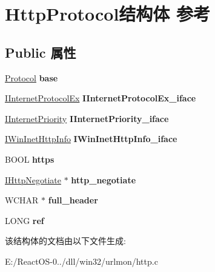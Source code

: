 \hypertarget{struct_http_protocol}{}\section{Http\+Protocol结构体 参考}
\label{struct_http_protocol}
\subsection*{Public 属性}
\begin{DoxyCompactItemize}
\item 
\mbox{\label{struct_http_protocol_a151cc2099e674107fa709330ba58706e}} 
\hyperlink{struct_protocol}{Protocol} {\bfseries base}
\item 
\mbox{\label{struct_http_protocol_a860d3064a3459a85f30484db3414093b}} 
\hyperlink{interface_i_internet_protocol_ex}{I\+Internet\+Protocol\+Ex} {\bfseries I\+Internet\+Protocol\+Ex\+\_\+iface}
\item 
\mbox{\label{struct_http_protocol_abe532b241a04ae9ff005e2d43a61b737}} 
\hyperlink{interface_i_internet_priority}{I\+Internet\+Priority} {\bfseries I\+Internet\+Priority\+\_\+iface}
\item 
\mbox{\label{struct_http_protocol_a8bc6209647dd18b9ab90d6782fad1ef6}} 
\hyperlink{interface_i_win_inet_http_info}{I\+Win\+Inet\+Http\+Info} {\bfseries I\+Win\+Inet\+Http\+Info\+\_\+iface}
\item 
\mbox{\label{struct_http_protocol_a8d9721ac149323721011f81b6c01925f}} 
B\+O\+OL {\bfseries https}
\item 
\mbox{\label{struct_http_protocol_a3ea845429bd8e60c7f5843ba45e1460c}} 
\hyperlink{interface_i_http_negotiate}{I\+Http\+Negotiate} $\ast$ {\bfseries http\+\_\+negotiate}
\item 
\mbox{\label{struct_http_protocol_aafe8825a1634a774a0915ee92fc1c5e2}} 
W\+C\+H\+AR $\ast$ {\bfseries full\+\_\+header}
\item 
\mbox{\label{struct_http_protocol_ae4cb1871d200d1f59905107beb0857ea}} 
L\+O\+NG {\bfseries ref}
\end{DoxyCompactItemize}


该结构体的文档由以下文件生成\+:\begin{DoxyCompactItemize}
\item 
E\+:/\+React\+O\+S-\/0../dll/win32/urlmon/http.\+c\end{DoxyCompactItemize}
